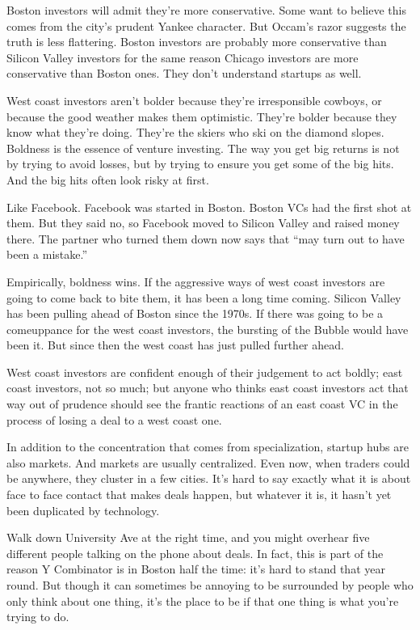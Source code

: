 \documentclass[12pt]{book}
\begin{document}
Boston investors will admit they're more conservative. Some want to
believe this comes from the city's prudent Yankee character. But Occam's
razor suggests the truth is less flattering. Boston investors are
probably more conservative than Silicon Valley investors for the same
reason Chicago investors are more conservative than Boston ones. They
don't understand startups as well.

West coast investors aren't bolder because they're irresponsible
cowboys, or because the good weather makes them optimistic. They're
bolder because they know what they're doing. They're the skiers who ski
on the diamond slopes. Boldness is the essence of venture investing. The
way you get big returns is not by trying to avoid losses, but by trying
to ensure you get some of the big hits. And the big hits often look
risky at first.

Like Facebook. Facebook was started in Boston. Boston VCs had the first
shot at them. But they said no, so Facebook moved to Silicon Valley and
raised money there. The partner who turned them down now says that ``may
turn out to have been a mistake.''

Empirically, boldness wins. If the aggressive ways of west coast
investors are going to come back to bite them, it has been a long time
coming. Silicon Valley has been pulling ahead of Boston since the 1970s.
If there was going to be a comeuppance for the west coast investors, the
bursting of the Bubble would have been it. But since then the west coast
has just pulled further ahead.

West coast investors are confident enough of their judgement to act
boldly; east coast investors, not so much; but anyone who thinks east
coast investors act that way out of prudence should see the frantic
reactions of an east coast VC in the process of losing a deal to a west
coast one.

In addition to the concentration that comes from specialization, startup
hubs are also markets. And markets are usually centralized. Even now,
when traders could be anywhere, they cluster in a few cities. It's hard
to say exactly what it is about face to face contact that makes deals
happen, but whatever it is, it hasn't yet been duplicated by technology.

Walk down University Ave at the right time, and you might overhear five
different people talking on the phone about deals. In fact, this is part
of the reason Y Combinator is in Boston half the time: it's hard to
stand that year round. But though it can sometimes be annoying to be
surrounded by people who only think about one thing, it's the place to
be if that one thing is what you're trying to do.
\end{document}
